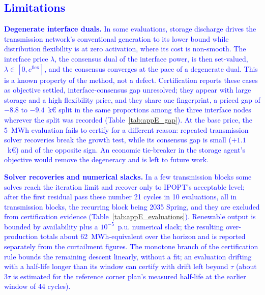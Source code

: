 \documentclass[preprint,12pt]{elsarticle}
\begin{document}
\subsection{\textcolor{blue}{Limitations}}
\label{subsec:res_limitations}

\textcolor{blue}{
    \textbf{Degenerate interface duals.} In some evaluations, storage discharge drives the transmission network's conventional generation to its lower bound while distribution flexibility is at zero activation, where its cost is non-smooth. The interface price $\lambda$, the consensus dual of the interface power, is then set-valued, $\lambda \in [0, c^{\text{flex}}]$, and the consensus converges at the pace of a degenerate dual. This is a known property of the method, not a defect. Certification reports these cases as objective settled, interface-consensus gap unresolved; they appear with large storage and a high flexibility price, and they share one fingerprint, a priced gap of $-8.8$ to $-9.4$~k\euro{} split in the same proportions among the three interface nodes wherever the split was recorded (Table~\ref{tab:appE_gap}). At the base price, the 5~MWh evaluation fails to certify for a different reason: repeated transmission solver recoveries break the growth test, while its consensus gap is small ($+1.1$~k\euro) and of the opposite sign. An economic tie-breaker in the storage agent's objective would remove the degeneracy and is left to future work.
}

\textcolor{blue}{
    \textbf{Solver recoveries and numerical slacks.} In a few transmission blocks some solves reach the iteration limit and recover only to IPOPT's acceptable level; after the first residual pass these number 21 cycles in 10 evaluations, all in transmission blocks, the recurring block being 2035 Spring, and they are excluded from certification evidence (Table~\ref{tab:appE_evaluations}). Renewable output is bounded by availability plus a $10^{-5}$~p.u. numerical slack; the resulting over-production totals about 62~MWh-equivalent over the horizon and is reported separately from the curtailment figures. The monotone branch of the certification rule bounds the remaining descent linearly, without a fit; an evaluation drifting with a half-life longer than its window can certify with drift left beyond $\tau$ (about $3\tau$ is estimated for the reference corner plan's measured half-life at the earlier window of 44 cycles).
}
\end{document}
